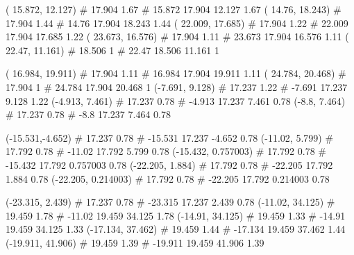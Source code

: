 \documentclass[a4paper,openbib,10pt]{article}
\newenvironment{treegraph}{\begin{graph}}{\end{graph}}
\begin{document}
\begin{treegraph}
  ( 15.872, 12.127) #     17.904    1.67
   #    15.872    17.904    12.127    1.67
  ( 14.76, 18.243) #     17.904    1.44
   #    14.76    17.904    18.243    1.44
  ( 22.009, 17.685) #     17.904    1.22
   #    22.009    17.904    17.685    1.22
  ( 23.673, 16.576) #     17.904    1.11
   #    23.673    17.904    16.576    1.11
  ( 22.47, 11.161) #     18.506    1
   #    22.47    18.506    11.161    1

  ( 16.984, 19.911) #     17.904    1.11
   #    16.984    17.904    19.911    1.11
  ( 24.784, 20.468) #     17.904    1
   #    24.784    17.904    20.468    1
  (-7.691, 9.128) #     17.237    1.22
   #    -7.691    17.237    9.128    1.22
  (-4.913, 7.461) #     17.237    0.78
   #    -4.913    17.237    7.461    0.78
  (-8.8, 7.464) #     17.237    0.78
   #    -8.8    17.237    7.464    0.78

  (-15.531,-4.652) #     17.237    0.78
   #    -15.531    17.237    -4.652    0.78
  (-11.02, 5.799) #     17.792    0.78
   #    -11.02    17.792    5.799    0.78
  (-15.432, 0.757003) #     17.792    0.78
   #    -15.432    17.792    0.757003    0.78
  (-22.205, 1.884) #     17.792    0.78
   #    -22.205    17.792    1.884    0.78
  (-22.205, 0.214003) #     17.792    0.78
   #    -22.205    17.792    0.214003    0.78

  (-23.315, 2.439) #     17.237    0.78
   #    -23.315    17.237    2.439    0.78
  (-11.02, 34.125) #     19.459    1.78
   #    -11.02    19.459    34.125    1.78
  (-14.91, 34.125) #     19.459    1.33
   #    -14.91    19.459    34.125    1.33
  (-17.134, 37.462) #     19.459    1.44
   #    -17.134    19.459    37.462    1.44
  (-19.911, 41.906) #     19.459    1.39
   #    -19.911    19.459    41.906    1.39


\end{treegraph}
\end{document}
